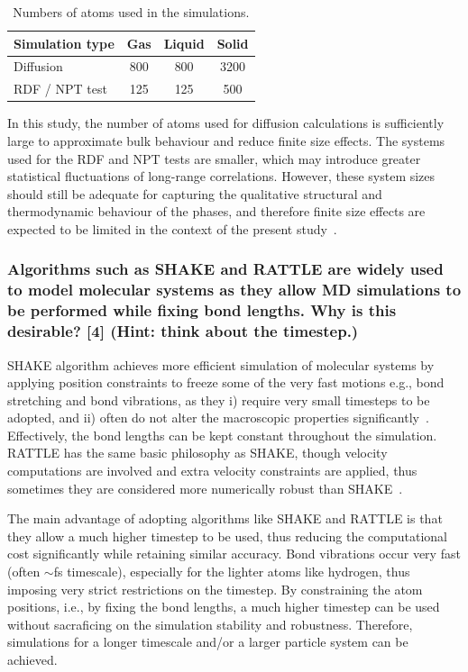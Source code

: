 \documentclass[a4paper,10pt,twocolumn]{article}
\begin{document}
\begin{table}[H]
\centering
\caption{Numbers of atoms used in the simulations.}
\label{tab:atom_numbers}
\begin{tabular}{lccc}
\toprule
Simulation type & Gas & Liquid & Solid \\
\midrule
Diffusion & 800 & 800 & 3200 \\
RDF / NPT test & 125 & 125 & 500 \\
\bottomrule
\end{tabular}
\end{table}

In this study, the number of atoms used for diffusion calculations is sufficiently large to approximate bulk behaviour and reduce finite size effects. The systems used for the RDF and NPT tests are smaller, which may introduce greater statistical fluctuations of long-range correlations. However, these system sizes should still be adequate for capturing the qualitative structural and thermodynamic behaviour of the phases, and therefore finite size effects are expected to be limited in the context of the present study~\cite{frenkel2023understanding}.

\subsubsection*{Algorithms such as SHAKE and RATTLE are widely used to model molecular systems as they allow MD simulations to be performed while fixing bond lengths. Why is this desirable? [4] (Hint: think about the timestep.)}

SHAKE algorithm achieves more efficient simulation of molecular systems by applying position constraints to freeze some of the very fast motions e.g., bond stretching and bond vibrations, as they i) require very small timesteps to be adopted, and ii) often do not alter the macroscopic properties significantly~\cite{ryckaert1977numerical}. Effectively, the bond lengths can be kept constant throughout the simulation. RATTLE has the same basic philosophy as SHAKE, though velocity computations are involved and extra velocity constraints are applied, thus sometimes they are considered more numerically robust than SHAKE~\cite{andersen1983rattle}.

The main advantage of adopting algorithms like SHAKE and RATTLE is that they allow a much higher timestep to be used, thus reducing the computational cost significantly while retaining similar accuracy. Bond vibrations occur very fast (often $\sim$fs timescale), especially for the lighter atoms like hydrogen, thus imposing very strict restrictions on the timestep. By constraining the atom positions, i.e., by fixing the bond lengths, a much higher timestep can be used without sacraficing on the simulation stability and robustness. Therefore, simulations for a longer timescale and/or a larger particle system can be achieved.
\end{document}
